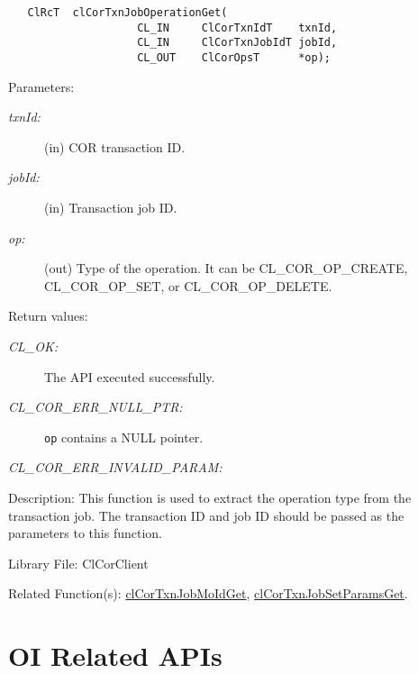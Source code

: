 \begin{flushleft}
\begin{Desc}
\footnotesize\begin{verbatim}   ClRcT  clCorTxnJobOperationGet(
					CL_IN     ClCorTxnIdT    txnId,
					CL_IN     ClCorTxnJobIdT jobId,
					CL_OUT    ClCorOpsT      *op);
\end{verbatim}
\normalsize
\end{Desc}
\begin{Desc}
\item[Parameters:]
\begin{description}
\item[{\em txn\-Id:}](in) COR transaction ID.
\item[{\em job\-Id:}](in) Transaction job ID.
\item[{\em *op:}](out) Type of the operation. It can be CL\_\-COR\_\-OP\_\-CREATE, CL\_\-COR\_\-OP\_\-SET, or CL\_\-COR\_\-OP\_\-DELETE.
\end{description}
\end{Desc}
\begin{Desc}
\item[Return values:]
\begin{description}
\item[{\em CL\_\-OK:}]The API executed successfully. 
\item[{\em CL\_\-COR\_\-ERR\_\-NULL\_\-PTR:}] {\tt{op}} contains a NULL pointer.
\item[{\em CL\_\-COR\_\-ERR\_\-INVALID\_\-PARAM:}] 
\end{description}
\end{Desc}
\begin{Desc}
\item[Description:] This function is used to extract the operation type from the transaction job. The transaction ID and job ID should be passed as the 
parameters to this function. 
\end{Desc}
\begin{Desc}
\item[Library File:]Cl\-Cor\-Client\end{Desc}
\begin{Desc}
\item[Related Function(s):]\hyperlink{pagecor202}{clCorTxnJobMoIdGet}, \hyperlink{pagecor203}{clCorTxnJobSetParamsGet}.
\end{Desc} 	
\newpage





\section{OI Related APIs}


\end{flushleft}
